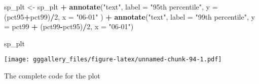 \documentclass[]{book}
\newenvironment{Shaded}{\begin{snugshade}}{\end{snugshade}}
\newcommand{\DataTypeTok}[1]{\textcolor[rgb]{0.13,0.29,0.53}{#1}}
\newcommand{\DecValTok}[1]{\textcolor[rgb]{0.00,0.00,0.81}{#1}}
\newcommand{\KeywordTok}[1]{\textcolor[rgb]{0.13,0.29,0.53}{\textbf{#1}}}
\newcommand{\NormalTok}[1]{#1}
\newcommand{\OperatorTok}[1]{\textcolor[rgb]{0.81,0.36,0.00}{\textbf{#1}}}
\newcommand{\StringTok}[1]{\textcolor[rgb]{0.31,0.60,0.02}{#1}}
\begin{document}
\begin{Shaded}
\begin{Highlighting}[]
\NormalTok{sp_plt <-}\StringTok{ }\NormalTok{sp_plt }\OperatorTok{+}\StringTok{ }
\StringTok{  }\KeywordTok{annotate}\NormalTok{(}\StringTok{"text"}\NormalTok{, }\DataTypeTok{label =} \StringTok{"95th percentile"}\NormalTok{, }\DataTypeTok{y =}\NormalTok{ (pct95}\OperatorTok{+}\NormalTok{pct99)}\OperatorTok{/}\DecValTok{2}\NormalTok{, }\DataTypeTok{x =} \StringTok{"06-01"}\NormalTok{ ) }\OperatorTok{+}
\StringTok{  }\KeywordTok{annotate}\NormalTok{(}\StringTok{"text"}\NormalTok{, }\DataTypeTok{label =} \StringTok{"99th percentile"}\NormalTok{, }\DataTypeTok{y =}\NormalTok{ pct99 }\OperatorTok{+}\StringTok{ }\NormalTok{(pct99}\OperatorTok{-}\NormalTok{pct95)}\OperatorTok{/}\DecValTok{2}\NormalTok{, }\DataTypeTok{x =} \StringTok{"06-01"}\NormalTok{)}

\NormalTok{sp_plt}
\end{Highlighting}
\end{Shaded}

\texttt{[image: gggallery\_files/figure-latex/unnamed-chunk-94-1.pdf]}

The complete code for the plot
\end{document}
